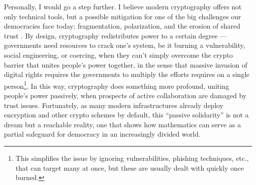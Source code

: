 \documentclass[10pt]{article}
\begin{document}
Personally, I would go a step further. I believe modern cryptography offers not
only technical tools, but a possible mitigation for one of the big
challenges our democracies face today: fragmentation, polarization, and the
erosion of shared trust \cite{trust.book.fukuyama, how.democracies.die,
cultural.backlash}. By
design, cryptography redistributes power to a certain degree --- governments
need resources to crack one's system, be it burning a vulnerability, social
engineering, or coercing, when they can't simply overcome the crypto barrier
that unites people's power together, in the sense that massive
invasion of digital rights requires the governments to multiply the efforts
requires on a single person\footnote{This simplifies the issue by ignoring
vulnerabilities, phishing techniques, etc., that can target many at once, but
these are usually dealt with quickly once burned.}. In this way, cryptography
does something more profound, uniting people's power passively, when prospects
of active collaboration are damaged by trust issues.  Fortunately, as many
modern infrastructures already deploy encryption and other crypto schemes by
default, this ``passive solidarity'' is not a dream but a reachable reality,
one that shows how mathematics can serve as a partial safeguard for democracy
in an increasingly divided world.
\end{document}

